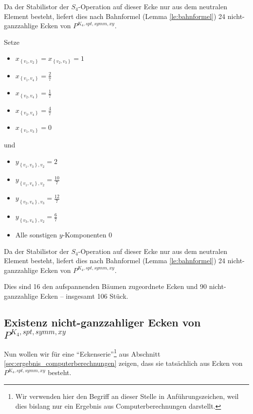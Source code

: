 \documentclass[10p,a4paper,BCOR = 12mm, DIV=15]{scrbook}
\begin{document}
{\begin{Bem}
Da der Stabilistor der $S_4$-Operation auf dieser Ecke nur aus dem neutralen Element besteht, liefert dies nach Bahnformel (Lemma \ref{le:bahnformel}) 24 nicht-ganzzahlige Ecken von $P^{K_4, spt, symm, xy}$.
\end{Bem}

\begin{Bem}
Setze
\begin{itemize}
\item $x_{\left\{v_1, v_2\right\}} = x_{\left\{v_2, v_3\right\}} = 1$
\item $x_{\left\{v_1, v_4\right\}} = \frac{2}{7}$
\item $x_{\left\{v_2, v_4\right\}} = \frac{1}{7}$
\item $x_{\left\{v_3, v_4\right\}} = \frac{4}{7}$
\item $x_{\left\{v_1, v_3\right\}} = 0$
\end{itemize}
und
\begin{itemize}
\item $y_{\left\{v_1, v_3\right\}, v_2} = 2$
\item $y_{\left\{v_1, v_4\right\}, v_2} = \frac{10}{7}$
\item $y_{\left\{v_2, v_4\right\}, v_3} = \frac{12}{7}$
\item $y_{\left\{v_3, v_4\right\}, v_2} = \frac{6}{7}$
\item Alle sonstigen $y$-Komponenten $0$
\end{itemize}

Da der Stabilistor der $S_4$-Operation auf dieser Ecke nur aus dem neutralen Element besteht, liefert dies nach Bahnformel (Lemma \ref{le:bahnformel}) 24 nicht-ganzzahlige Ecken von $P^{K_4, spt, symm, xy}$.
\end{Bem}

Dies sind 16 den aufspannenden Bäumen zugeordnete Ecken und 90 nicht-ganz\-zahlige Ecken -- insgesamt 106 Stück.

\subsection{Existenz nicht-ganzzahliger Ecken von $P^{K_4, spt, symm, xy}$}

Nun wollen wir für eine  "`Eckenserie"'\footnote{Wir verwenden hier den Begriff an dieser Stelle in Anführungszeichen, weil dies bislang nur ein Ergebnis aus Computerberechnungen darstellt.} aus Abschnitt \ref{sec:ergebnis_computerberechnungen} zeigen, dass sie tatsächlich aus Ecken von $P^{K_4, spt, symm, xy}$ besteht.

}
\end{document}
